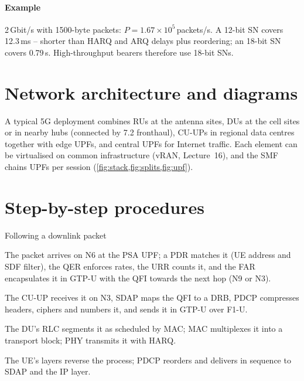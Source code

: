 \documentclass[11pt,a4paper]{article}
\begin{document}
\paragraph{Example} 2\,Gbit/s with 1500-byte packets: $P = 1.67\times10^5$\,packets/s. A 12-bit SN covers 12.3\,ms -- shorter than HARQ and ARQ delays plus
reordering; an 18-bit SN covers 0.79\,s. High-throughput bearers therefore use 18-bit SNs.

\section{Network architecture and diagrams}
A typical 5G deployment combines RUs at the antenna sites, DUs at the cell sites or in nearby hubs (connected by 7.2 fronthaul), CU-UPs in regional
data centres together with edge UPFs, and central UPFs for Internet traffic. Each element can be virtualised on common infrastructure
(vRAN, Lecture~16), and the SMF chains UPFs per session (\cref{fig:stack,fig:splits,fig:upf}).

\section{Step-by-step procedures}

\begin{procedurebox}{Following a downlink packet}\label{proc:dl}
\begin{steps}
  \item The packet arrives on N6 at the PSA UPF; a PDR matches it (UE address and SDF filter), the QER enforces rates, the URR counts it, and the FAR
        encapsulates it in GTP-U with the QFI towards the next hop (N9 or N3).
  \item The CU-UP receives it on N3, SDAP maps the QFI to a DRB, PDCP compresses headers, ciphers and numbers it, and sends it in GTP-U over F1-U.
  \item The DU's RLC segments it as scheduled by MAC; MAC multiplexes it into a transport block; PHY transmits it with HARQ.
  \item The UE's layers reverse the process; PDCP reorders and delivers in sequence to SDAP and the IP layer.
\end{steps}
\end{procedurebox}
\end{document}
